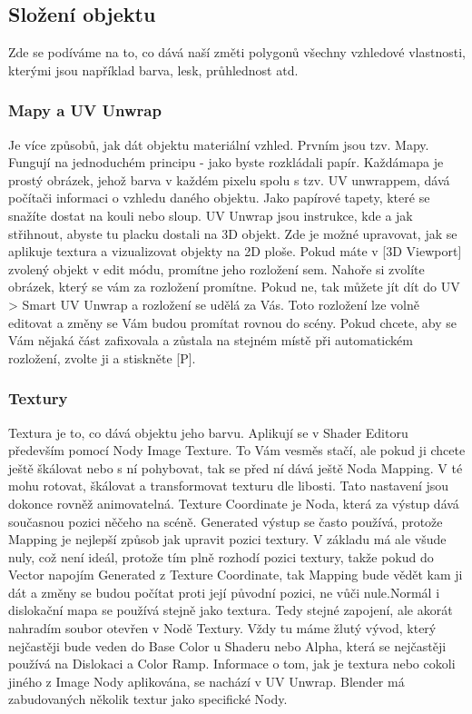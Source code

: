 \documentclass[12pt,a4paper]{report}
\begin{document}
	\subsection{Složení objektu}
	Zde se podíváme na to, co dává naší změti polygonů všechny vzhledové
	vlastnosti, kterými jsou například barva, lesk, průhlednost atd.
	
	\subsubsection{Mapy a UV Unwrap}
	\label{section:maps}
	Je více způsobů, jak dát objektu materiální vzhled. Prvním jsou tzv. Mapy.
	Fungují na jednoduchém principu - jako byste rozkládali papír. Každámapa je prostý obrázek, jehož barva v každém pixelu spolu s tzv. UV
	unwrappem, dává počítači informaci o vzhledu daného objektu. Jako
	papírové tapety, které se snažíte dostat na kouli nebo sloup. UV Unwrap
	jsou instrukce, kde a jak střihnout, abyste tu placku dostali na 3D objekt.
	Zde je možné upravovat, jak se aplikuje textura a vizualizovat objekty na
	2D ploše.
	Pokud máte v [3D Viewport] zvolený objekt v edit módu, promítne jeho
	rozložení sem. Nahoře si zvolíte obrázek, který se vám za rozložení
	promítne. Pokud ne, tak můžete jít dít do UV > Smart UV Unwrap a
	rozložení se udělá za Vás. Toto rozložení lze volně editovat a změny se
	Vám budou promítat rovnou do scény.
	Pokud chcete, aby se Vám nějaká část zafixovala a zůstala na stejném
	místě při automatickém rozložení, zvolte ji a stiskněte [P].
	
	\subsubsection{Textury}
	Textura je to, co dává objektu jeho barvu.
	Aplikují se v Shader Editoru především pomocí Nody Image Texture. To
	Vám vesměs stačí, ale pokud ji chcete ještě škálovat nebo s ní pohybovat,
	tak se před ní dává ještě Noda Mapping. V té mohu rotovat, škálovat a
	transformovat texturu dle libosti. Tato nastavení jsou dokonce rovněž
	animovatelná. Texture Coordinate je Noda, která za výstup dává
	současnou pozici něčeho na scéně. Generated výstup se často používá,
	protože Mapping je nejlepší způsob jak upravit pozici textury. V základu
	má ale všude nuly, což není ideál, protože tím plně rozhodí pozici textury,
	takže pokud do Vector napojím Generated z Texture Coordinate, tak
	Mapping bude vědět kam ji dát a změny se budou počítat proti její
	původní pozici, ne vůči nule.Normál i dislokační mapa se používá stejně jako textura. Tedy stejné
	zapojení, ale akorát nahradím soubor otevřen v Nodě Textury. Vždy tu
	máme žlutý vývod, který nejčastěji bude veden do Base Color u Shaderu
	nebo Alpha, která se nejčastěji používá na Dislokaci a Color Ramp.
	Informace o tom, jak je textura nebo cokoli jiného z Image Nody
	aplikována, se nachází v UV Unwrap. Blender má zabudovaných několik
	textur jako specifické Nody.
	
\end{document}
